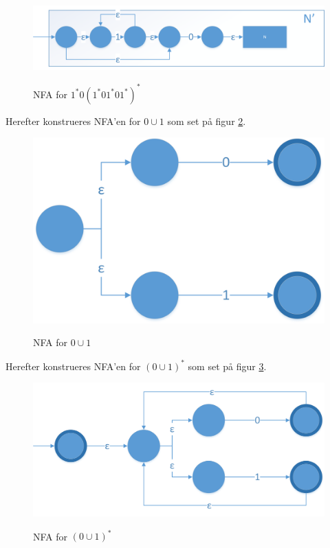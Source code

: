 \documentclass[a4paper,10pt,article]{memoir}
\begin{document}
\begin{figure}[h]%
\centering
\includegraphics[width=\textwidth]{Fig10x.png}
\label{fig:fig10}
\caption{NFA for $1^*0(1^*01^*01^*)^*$}
\end{figure}

Herefter konstrueres NFA'en for $0\cup1$ som set på figur \ref{fig:fig11}.

\begin{figure}[h]%
\centering
\includegraphics[width=\textwidth]{Fig11x.png}
\label{fig:fig11}
\caption{NFA for $0\cup1$}
\end{figure}
Herefter konstrueres NFA'en for $(0\cup1)^*$ som set på figur \ref{fig:fig12}.

\begin{figure}[h]%
\centering
\includegraphics[width=\textwidth]{Fig12x.png}
\label{fig:fig12}
\caption{NFA for $(0\cup1)^*$}
\end{figure}
\end{document}
